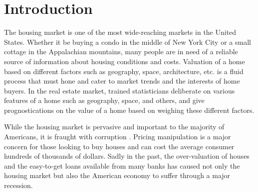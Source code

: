 \documentclass[fleqn,10pt]{SelfArx} %
\affiliation{\textsuperscript{1}\textit{Computer Science, School of Informatics and Computing, Indiana University, Bloomington, IN, USA}} %
\affiliation{*\textbf{Corresponding authors}: {jl216, andnpatt, mkschleg}@indiana.edu} %
\begin{document}
\flushbottom %

\maketitle %

\tableofcontents %

\thispagestyle{empty} %


\section*{Introduction} %


The housing market is one of the most wide-reaching markets in the United States. Whether it be buying a condo in the middle of New York City or a small cottage in the
Appalachian mountains, many people are in need of a reliable source of information about housing conditions and costs. Valuation of a home based on different factors 
such as geography, space, architecture, etc. is a fluid process that must hone and cater to market trends and the interests of home buyers.  In the real estate market, 
trained statisticians deliberate on various features of a home such as geography, space, and others, and give prognostications on the value of a home based on weighing
these different factors.

While the housing market is pervasive and important to the majority of Americans, it is fraught with corruption \cite{lentz2009residential}. Pricing manipulation is a major
concern for those looking to buy houses and can cost the average consumer hundreds of thousands of dollars. Sadly in the past, the over-valuation of houses and the 
easy-to-get loans available from many banks has caused not only the housing market but also the American economy to suffer through a major recession.
\end{document}
